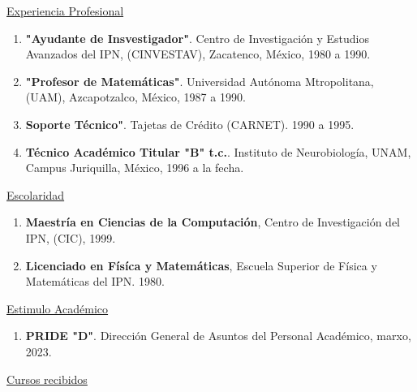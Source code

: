 \underline{\large Experiencia Profesional}

\begin{enumerate}[itemsep=-1mm]
\item \textbf{"Ayudante de Insvestigador"}. Centro de Investigación y Estudios Avanzados del IPN, (CINVESTAV), Zacatenco, México, 1980 a 1990.
\item \textbf{"Profesor de Matemáticas"}. Universidad Autónoma Mtropolitana, (UAM), Azcapotzalco, México, 1987 a 1990.

\item \textbf{Soporte Técnico"}. Tajetas de Crédito (CARNET). 1990 a 1995.

\item \textbf{Técnico Académico Titular "B" t.c.}. Instituto de Neurobiología, UNAM, Campus Juriquilla, México, 1996 a la fecha.

\end{enumerate}

\underline{\large Escolaridad}

\begin{enumerate}[itemsep=-1mm]
\item \textbf{Maestría en Ciencias de la Computación}, Centro de Investigación del IPN, (CIC), 1999.

\item \textbf{Licenciado en Físíca y Matemáticas}, Escuela Superior de Física y Matemáticas del IPN. 1980.
\end{enumerate}

\underline{\large Estimulo Académico}

\begin{enumerate}

\item \textbf{PRIDE "D"}. Dirección General de Asuntos del Personal Académico, marxo, 2023.

\end{enumerate}


\underline{\large Cursos recibidos}

